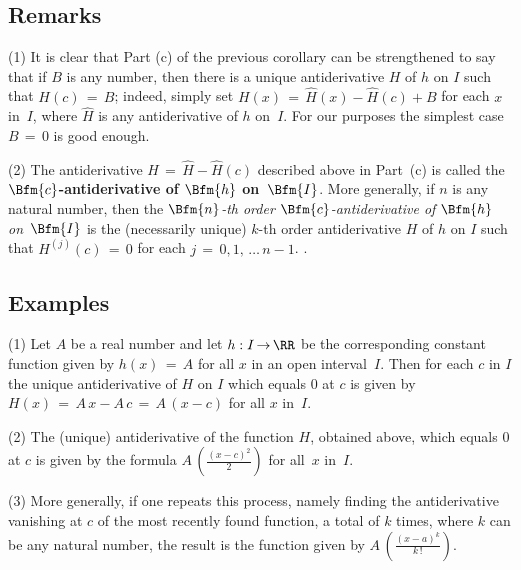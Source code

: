 {\V

            \subsection{\small{\bf Remarks}}
            \label{RemrkE40.65AB}

\V

        (1) It is clear that Part (c) of the previous corollary can be strengthened to say that if $B$ is any number,
    then there is a unique antiderivative $H$ of $h$ on $I$ such that $H(c) \,=\, B$;
    indeed, simply set ${H}(x) \,=\, \hat{H}(x) - \hat{H}(c) + B$ for each $x$ in~$I$, where $\hat{H}$ is any antiderivative of $h$ on~$I$.
    For our purposes the simplest case $B \,=\, 0$ is good enough.

\V

        (2) The antiderivative $H \,=\, \hat{H} - \hat{H}(c)$ described above in Part~(c) is called the {\bf $\Bfm{c}$-antiderivative of $\Bfm{h}$ on~$\Bfm{I}$}.
    More generally, if $n$ is any natural number, then the {\em $\Bfm{n}$-th order $\Bfm{c}$-antiderivative of $\Bfm{h}$ on~$\Bfm{I}$}
    is the (necessarily unique) $k$-th order antiderivative $H$ of $h$ on $I$ such that $H^{(j)}(c) \,=\, 0$ for each $j \,=\, 0, 1, \,{\ldots}\,n-1$.
    .

\V

            \subsection{\small{\bf Examples}}
            \label{ExampE40.65B}

\V

\hspace*{\parindent}(1) Let $A$ be a real number and let $h:I \,{\rightarrow}\, {\RR}$ be the corresponding constant function given by $h(x) \,=\, A$ for all $x$ in an open interval~$I$. Then for each $c$ in $I$
    the unique antiderivative of $H$ on $I$ which equals $0$ at $c$ is given by $H(x) \,=\, A\,x - A\,c \,=\, A\,(x-c)$ for all $x$ in~$I$.

\V

        (2) The (unique) antiderivative of the function $H$, obtained above, which equals $0$ at $c$
    is given by the formula ${\displaystyle A\,\left(\frac{(x-c)^{2}}{2}\right)}$ for all~$x$ in~$I$.

\V

        (3) More generally, if one repeats this process, namely finding the antiderivative vanishing at $c$ of the most recently found function,
    a total of $k$ times, where $k$ can be any natural number, the result is the function given by ${\displaystyle A\,\left(\frac{(x-a)^{k}}{k\,!}\right)}$.

}
